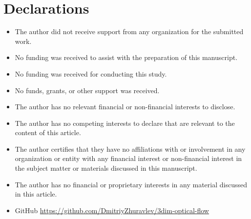 \documentclass[graybox]{svmult}
\begin{document}

\pagebreak





\section{Declarations}
\begin{itemize}
    \item The author did not receive support from any organization for the submitted work.
 \item No funding was received to assist with the preparation of this manuscript.
 \item No funding was received for conducting this study.
 \item No funds, grants, or other support was received. 
 \item  The author has no relevant financial or non-financial interests to disclose.
 \item The author has no competing interests to declare that are relevant to the content of this article.
 \item The author certifies that they have no affiliations with or involvement in any organization or entity with any financial interest or non-financial interest in the subject matter or materials discussed in this manuscript.
 \item The author has no financial or proprietary interests in any material discussed in this article.
 \item GitHub \url{https://github.com/DmitriyZhuravlev/3dim-optical-flow} 
\end{itemize}

\pagebreak


\end{document}
